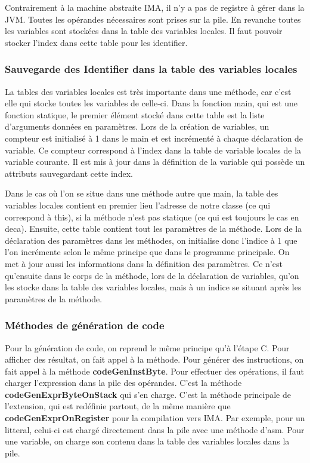 \documentclass[12pt, a4paper, one side]{article}
\begin{document}
    Contrairement à la machine abstraite IMA, il n'y a pas de registre à gérer
    dans la JVM. Toutes les opérandes nécessaires sont prises sur la pile.
    En revanche toutes les variables sont stockées dans la table des variables
    locales. Il faut pouvoir stocker l'index dans cette table pour les identifier.

    \subsubsection{Sauvegarde des Identifier dans la table des variables locales}

    La tables des variables locales est très importante dans une méthode, car c'est
    elle qui stocke toutes les variables de celle-ci. Dans la fonction main, qui
    est une fonction statique, le premier élément stocké dans cette table est la
    liste d'arguments données en paramètres. Lors de la création de variables,
    un compteur est initialisé à 1 dans le main et est incrémenté à chaque
    déclaration de variable. Ce compteur correspond à l'index dans la table de variable locales de la variable courante. Il est mis à jour dans la définition
    de la variable qui possède un attributs sauvegardant cette index.

    Dans le cas où l'on se situe dans une méthode autre que main, la table des
    variables locales contient en premier lieu l'adresse de notre classe (ce qui
    correspond à this), si la méthode n'est pas statique (ce qui est toujours le
    cas en deca). Ensuite, cette table contient tout les paramètres de la méthode.
    Lors de la déclaration des paramètres dans les méthodes, on initialise donc
    l'indice à 1 que l'on incrémente selon le même principe que dans le programme
    principale. On met à jour aussi les informations dans la définition des
    paramètres. Ce n'est qu'ensuite dans le corps de la méthode, lors de la
    déclaration de variables, qu'on les stocke dans la table des variables locales,
    mais à un indice se situant après les paramètres de la méthode.

    \subsubsection{Méthodes de génération de code}

    Pour la génération de code, on reprend le même principe qu'à l'étape C. Pour
    afficher des résultat, on fait appel à la méthode. Pour générer des
    instructions, on fait appel à la méthode \textbf{codeGenInstByte}.
    Pour effectuer des opérations, il faut charger l'expression dans la pile
    des opérandes. C'est la méthode \textbf{codeGenExprByteOnStack} qui s'en
    charge. C'est la méthode principale de l'extension, qui est redéfinie partout,
    de la même manière que \textbf{codeGenExprOnRegister} pour la compilation
    vers IMA. Par exemple, pour un litteral, celui-ci est chargé directement
    dans la pile avec une méthode d'asm. Pour une variable, on charge son contenu
    dans la table des variables locales dans la pile.
\end{document}
